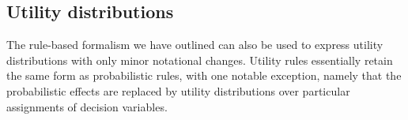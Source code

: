 
\subsection{Utility distributions}

The rule-based formalism we have outlined can also be used to express utility distributions with only minor notational changes. Utility rules essentially retain the same form as probabilistic rules, with one notable exception, namely that the probabilistic effects are replaced by utility distributions over particular assignments of decision variables. 


